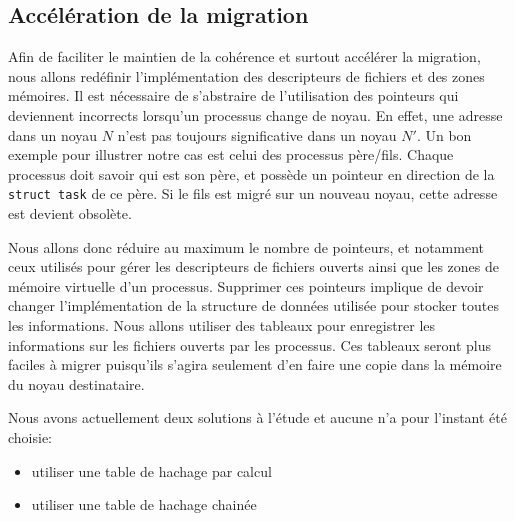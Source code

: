 

    \subsection{Accélération de la migration}

      Afin de faciliter le maintien de la cohérence et surtout accélérer la
      migration, nous allons redéfinir l'implémentation des descripteurs de
      fichiers et des zones mémoires. Il est nécessaire de s'abstraire de
      l'utilisation des pointeurs qui deviennent incorrects lorsqu'un processus
      change de noyau. En effet, une adresse dans un noyau $N$ n'est pas
      toujours significative dans un noyau $N'$. Un bon exemple pour illustrer
      notre cas est celui des processus père/fils. Chaque processus doit savoir
      qui est son père, et possède un pointeur en direction de la \texttt{struct
        task} de ce père. Si le fils est migré sur un nouveau noyau, cette
      adresse est devient obsolète.

      Nous allons donc réduire au maximum le nombre de pointeurs, et notamment
      ceux utilisés pour gérer les descripteurs de fichiers ouverts ainsi que
      les zones de mémoire virtuelle d'un processus. Supprimer ces pointeurs
      implique de devoir changer l'implémentation de la structure de données
      utilisée pour stocker toutes les informations. Nous allons utiliser des
      tableaux pour enregistrer les informations sur les fichiers ouverts par
      les processus. Ces tableaux seront plus faciles à migrer puisqu'ils
      s'agira seulement d'en faire une copie dans la mémoire du noyau
      destinataire.

      Nous avons actuellement deux solutions à l'étude et aucune n'a pour
      l'instant été choisie:
      \begin{itemize}
        \item utiliser une table de hachage par calcul
        \item utiliser une table de hachage chainée
      \end{itemize}

